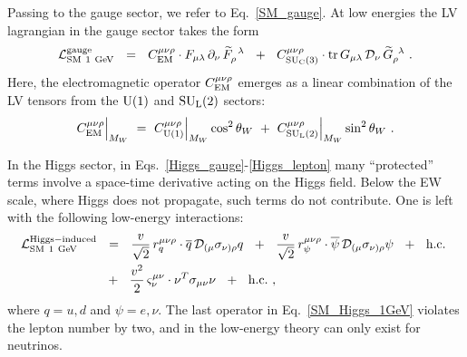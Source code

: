 \documentclass[12pt,preprintnumbers,nofootinbib]{revtex4}
\newcommand{\wt}{\widetilde}
\newcommand{\ov}{\overline}
\newcommand{\md}{\mathcal{D}}
\newcommand{\suc}{{{\rm SU}_{\rm C}(3)}}
\newcommand{\sul}{{{\rm SU}_{\rm L}(2)}}
\newcommand{\ue}{{{\rm U}(1)}}
\newcommand{\el}{{\rm EM}}
\begin{document}
	Passing to the gauge sector, we refer to Eq.~\eqref{SM_gauge}.
	At low energies the LV lagrangian in the gauge sector
	takes the form
\begin{equation}
\label{SM_gauge_1GeV}
	\mathcal{L}_{\rm SM\ 1~GeV}^{\rm gauge} ~~=~~
	C^{\mu\nu\rho}_\el \cdot 
	F_{\mu\lambda}\, \partial_\nu\, \wt{F}_\rho^{\phantom{\rho}\lambda}
	~~+~~
	C_{\suc}^{\mu\nu\rho} \cdot 
	{\rm tr}\,
	G_{\mu\lambda}\, \mathcal{D}_\nu\, \wt{G}_\rho^{\phantom{\rho}\lambda}
	~.
\end{equation}
	Here, the electromagnetic operator
$ C^{\mu\nu\rho}_\el $
	emerges as a linear combination of the LV
	tensors from the $ \ue $ and $ \sul $ sectors:
\[
	C^{\mu\nu\rho}_\el\Bigr|_{M_W} ~=~ 
		C^{\mu\nu\rho}_{\ue}\Bigr|_{M_W} \cos^2 \theta_W ~+~ 
		C^{\mu\nu\rho}_{\sul}\Bigr|_{M_W} \sin^2 \theta_W~.
\]


	In the Higgs sector, in Eqs.~\eqref{Higgs_gauge}-\eqref{Higgs_lepton} many
	``protected'' terms involve a space-time derivative acting on the Higgs field.
	Below the EW scale, where Higgs does not propagate, such terms do not contribute.
	One is left with the following low-energy interactions:
\begin{align}
\notag
	\mathcal{L}_{\rm SM\ 1~GeV}^{\rm Higgs-induced} & ~~=~~
	\frac{v}{\sqrt{2}}\,r_{q}^{\mu\nu\rho} \cdot \ov{q}\, \md_{(\mu} \sigma_{\nu)\rho} q   ~~+~~
	\frac{v}{\sqrt{2}}\,r_{\psi}^{\mu\nu\rho} \cdot \ov{\psi}\, \md_{(\mu} \sigma_{\nu)\rho} \psi 
	~~+~~
	\text{h.c.}~
	\\
	& 
\label{SM_Higgs_1GeV}
	~~+~~
	\frac{v^2}{2}\,\varsigma_\nu^{\mu\nu} \cdot \nu^T \sigma_{\mu\nu} \nu
	~~+~~
	\text{h.c.}~,
\end{align}
	where $ q = u, d $ and $ \psi = e, \nu $.
	The last operator in Eq.~\eqref{SM_Higgs_1GeV} violates the lepton number by 
	two, and in the low-energy theory can only exist for neutrinos.
\end{document}
